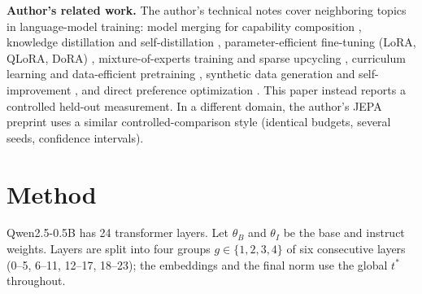 \documentclass[conference]{IEEEtran}
\begin{document}
\textbf{Author's related work.} The author's technical notes cover neighboring topics in language-model training: model merging for capability composition \cite{santos2026modelmergingfo}, knowledge distillation and self-distillation \cite{santos2026knowledgedisti}, parameter-efficient fine-tuning (LoRA, QLoRA, DoRA) \cite{santos2026parametereffic}, mixture-of-experts training and sparse upcycling \cite{santos2026mixtureofexper}, curriculum learning and data-efficient pretraining \cite{santos2026curriculumlear}, synthetic data generation and self-improvement \cite{santos2026syntheticdatag}, and direct preference optimization \cite{santos2026directpreferen}. This paper instead reports a controlled held-out measurement. In a different domain, the author's JEPA preprint \cite{santos2026collapseresist} uses a similar controlled-comparison style (identical budgets, several seeds, confidence intervals).

\section{Method}
Qwen2.5-0.5B has 24 transformer layers. Let $\theta_B$ and $\theta_I$ be the base and instruct weights. Layers are split into four groups $g\in\{1,2,3,4\}$ of six consecutive layers (0--5, 6--11, 12--17, 18--23); the embeddings and the final norm use the global $t^*$ throughout.
\end{document}
